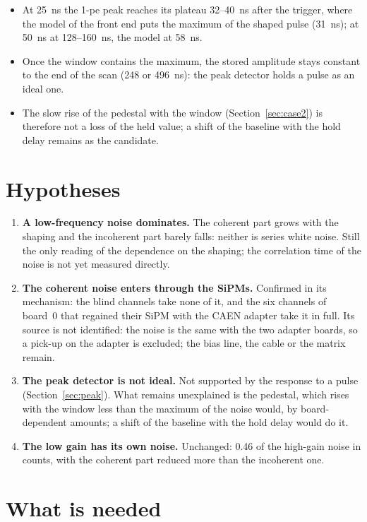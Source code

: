 \documentclass[11pt,a4paper]{article}
\begin{document}
\begin{itemize}
\item At 25~ns the 1-pe peak reaches its plateau 32--40~ns after the trigger, where the model
  of the front end puts the maximum of the shaped pulse (31~ns); at 50~ns at 128--160~ns, the
  model at 58~ns.
\item Once the window contains the maximum, the stored amplitude stays constant to the end of
  the scan (248 or 496~ns): the peak detector holds a pulse as an ideal one.
\item The slow rise of the pedestal with the window (Section~\ref{sec:case2}) is therefore not
  a loss of the held value; a shift of the baseline with the hold delay remains as the
  candidate.
\end{itemize}

\section{Hypotheses}

\begin{enumerate}
\item \textbf{A low-frequency noise dominates.} The coherent part grows with the shaping and
  the incoherent part barely falls: neither is series white noise. Still the only reading of
  the dependence on the shaping; the correlation time of the noise is not yet measured
  directly.
\item \textbf{The coherent noise enters through the SiPMs.} Confirmed in its mechanism: the
  blind channels take none of it, and the six channels of board~0 that regained their SiPM with
  the CAEN adapter take it in full. Its source is not identified: the noise is the same with
  the two adapter boards, so a pick-up on the adapter is excluded; the bias line, the cable or
  the matrix remain.
\item \textbf{The peak detector is not ideal.} Not supported by the response to a pulse
  (Section~\ref{sec:peak}). What remains unexplained is the pedestal, which rises with the
  window less than the maximum of the noise would, by board-dependent amounts; a shift of the
  baseline with the hold delay would do it.
\item \textbf{The low gain has its own noise.} Unchanged: 0.46 of the high-gain noise in
  counts, with the coherent part reduced more than the incoherent one.
\end{enumerate}

\section{What is needed}
\end{document}
